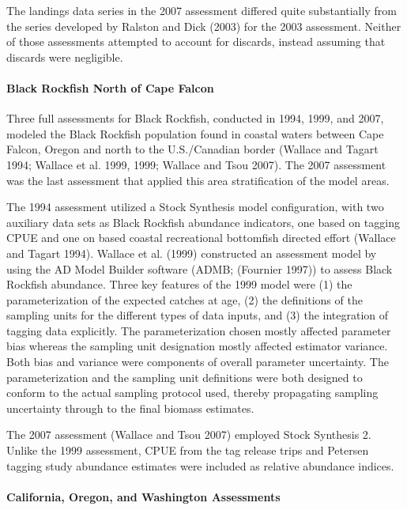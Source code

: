 \documentclass[11pt,
  english,
  letterpaper,
]{article}
\begin{document}
The landings data series in the 2007 assessment differed quite substantially from the series developed by Ralston and Dick (2003) for the 2003 assessment. Neither of those assessments attempted to account for discards, instead assuming that discards were negligible.

\hypertarget{black-rockfish-north-of-cape-falcon}{%
\paragraph{Black Rockfish North of Cape Falcon}\label{black-rockfish-north-of-cape-falcon}}

Three full assessments for Black Rockfish, conducted in 1994, 1999, and 2007, modeled the Black Rockfish population found in coastal waters between Cape Falcon, Oregon and north to the U.S./Canadian border (Wallace and Tagart 1994; Wallace et al. 1999, 1999; Wallace and Tsou 2007). The 2007 assessment was the last assessment that applied this area stratification of the model areas.

The 1994 assessment utilized a Stock Synthesis model configuration, with two auxiliary data sets as Black Rockfish abundance indicators, one based on tagging CPUE and one on based coastal recreational bottomfish directed effort (Wallace and Tagart 1994). Wallace et al. (1999) constructed an assessment model by using the AD Model Builder software (ADMB; (Fournier 1997)) to assess Black Rockfish abundance. Three key features of the 1999 model were (1) the parameterization of the expected catches at age, (2) the definitions of the sampling units for the different types of data inputs, and (3) the integration of tagging data explicitly. The parameterization chosen mostly affected parameter bias whereas the sampling unit designation mostly affected estimator variance. Both bias and variance were components of overall parameter uncertainty. The parameterization and the sampling unit definitions were both designed to conform to the actual sampling protocol used, thereby propagating sampling uncertainty through to the final biomass estimates.

The 2007 assessment (Wallace and Tsou 2007) employed Stock Synthesis 2. Unlike the 1999 assessment, CPUE from the tag release trips and Petersen tagging study abundance estimates were included as relative abundance indices.

\hypertarget{california-oregon-and-washington-assessments}{%
\paragraph{California, Oregon, and Washington Assessments}\label{california-oregon-and-washington-assessments}}
\end{document}
